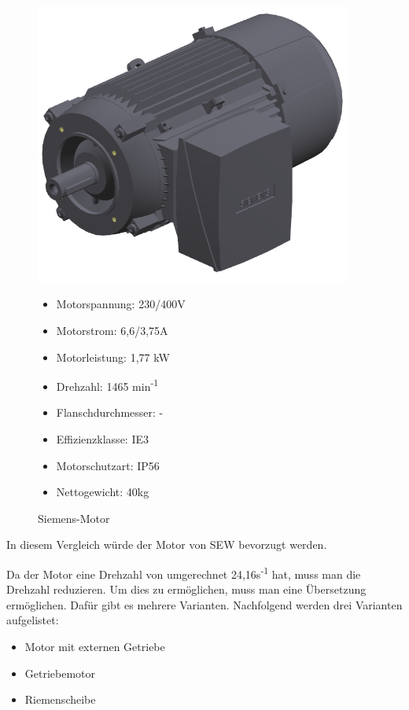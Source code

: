 \begin{figure}[H]
\begin{minipage}[t]{0.45\textwidth}
\includegraphics[width=0.93\textwidth]{fig/SiemensMotor}
\caption{Siemens-Motor}

\begin{itemize}
	\item{Motorspannung: 230/400V}
	\item{Motorstrom: 6,6/3,75A}
	\item{Motorleistung: 1,77 kW}
	\item{Drehzahl: 1465 min\textsuperscript{-1}}
	\item{Flanschdurchmesser: -}
	\item{Effizienzklasse: IE3}
	\item{Motorschutzart: IP56}
	\item{Nettogewicht: 40kg}
\end{itemize}

\end{minipage}
\end{figure}

In diesem Vergleich würde der Motor von SEW bevorzugt werden.

Da der Motor eine Drehzahl von umgerechnet 24,16s\textsuperscript{-1} hat, muss man die Drehzahl reduzieren. Um dies zu ermöglichen, muss man eine Übersetzung ermöglichen. Dafür gibt es mehrere Varianten. Nachfolgend werden drei Varianten aufgelistet:

\begin{itemize}
	\item{Motor mit externen Getriebe}
	\item{Getriebemotor}
	\item{Riemenscheibe}
\end{itemize}

